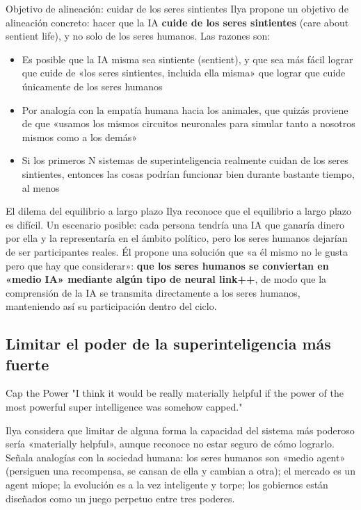 \begin{importantbox}{Objetivo de alineación: cuidar de los seres sintientes}
Ilya propone un objetivo de alineación concreto: hacer que la IA \textbf{cuide de los seres sintientes} (care about sentient life), y no solo de los seres humanos. Las razones son:
\begin{itemize}
    \item Es posible que la IA misma sea sintiente (sentient), y que sea más fácil lograr que cuide de «los seres sintientes, incluida ella misma» que lograr que cuide únicamente de los seres humanos
    \item Por analogía con la empatía humana hacia los animales, que quizás proviene de que «usamos los mismos circuitos neuronales para simular tanto a nosotros mismos como a los demás»
    \item Si los primeros N sistemas de superinteligencia realmente cuidan de los seres sintientes, entonces las cosas podrían funcionar bien durante bastante tiempo, al menos
\end{itemize}
\end{importantbox}

\begin{warningbox}{El dilema del equilibrio a largo plazo}
Ilya reconoce que el equilibrio a largo plazo es difícil. Un escenario posible: cada persona tendría una IA que ganaría dinero por ella y la representaría en el ámbito político, pero los seres humanos dejarían de ser participantes reales. Él propone una solución que «a él mismo no le gusta pero que hay que considerar»: \textbf{que los seres humanos se conviertan en «medio IA» mediante algún tipo de neural link++}, de modo que la comprensión de la IA se transmita directamente a los seres humanos, manteniendo así su participación dentro del ciclo.
\end{warningbox}

\subsection{Limitar el poder de la superinteligencia más fuerte}

\begin{importantbox}{Cap the Power}
"I think it would be really materially helpful if the power of the most powerful super intelligence was somehow capped."

Ilya considera que limitar de alguna forma la capacidad del sistema más poderoso sería «materially helpful», aunque reconoce no estar seguro de cómo lograrlo. Señala analogías con la sociedad humana: los seres humanos son «medio agent» (persiguen una recompensa, se cansan de ella y cambian a otra); el mercado es un agent miope; la evolución es a la vez inteligente y torpe; los gobiernos están diseñados como un juego perpetuo entre tres poderes.
\end{importantbox}

